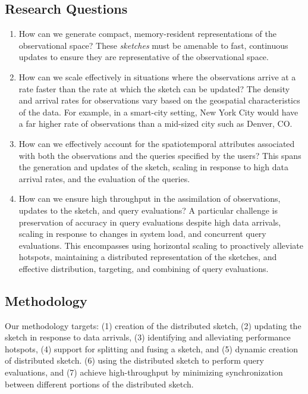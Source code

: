 \subsection{Research Questions}
\begin{enumerate}
    \item   How can we generate compact, memory-resident representations of the observational space? These \emph{sketches} must be amenable to fast, continuous updates to ensure they are representative of the observational space.
    \item   How can we scale effectively in situations where the observations arrive at a rate faster than the rate at which the sketch can be updated? The density and arrival rates for observations vary based on the geospatial characteristics of the data. For example, in a smart-city setting, New York City would have a far higher rate of observations than a mid-sized city such as Denver, CO.
    \item   How can we effectively account for the spatiotemporal attributes associated with both the observations and the queries specified by the users? This spans the generation and updates of the sketch, scaling in response to high data arrival rates, and the evaluation of the queries.
    \item   How can we ensure high throughput in the assimilation of observations, updates to the sketch, and query evaluations? A particular challenge is preservation of accuracy in query evaluations despite high data arrivals, scaling in response to changes in system load, and concurrent query evaluations.  This encompasses using horizontal scaling to proactively alleviate hotspots, maintaining a distributed representation of the sketches, and effective distribution, targeting, and combining of query evaluations.
\end{enumerate}

\subsection{Methodology}
Our methodology targets: (1) creation of the distributed sketch, (2) updating the sketch in response to data arrivals, (3) identifying and alleviating performance hotspots, (4) support for splitting and fusing a sketch, and (5) dynamic creation of distributed sketch. (6) using the distributed sketch to perform query evaluations, and (7) achieve high-throughput by minimizing synchronization between different portions of the distributed sketch. 


